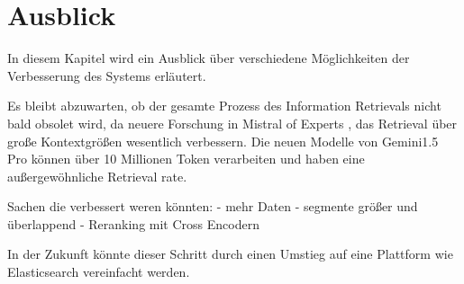 \chapter{Ausblick}\label{ch:outlook}

In diesem Kapitel wird ein Ausblick über verschiedene Möglichkeiten der Verbesserung des Systems erläutert.

Es bleibt abzuwarten, ob der gesamte Prozess des Information Retrievals nicht bald obsolet wird, da neuere Forschung in Mistral of Experts \cite{jiang2024}, das Retrieval über große Kontextgrößen wesentlich verbessern.
Die neuen Modelle von Gemini1.5 Pro können über 10 Millionen Token verarbeiten und haben eine außergewöhnliche Retrieval rate.


Sachen die verbessert weren könnten:
- mehr Daten
- segmente größer und überlappend
- Reranking mit Cross Encodern

In der Zukunft könnte dieser Schritt durch einen Umstieg auf eine Plattform wie Elasticsearch vereinfacht werden.
